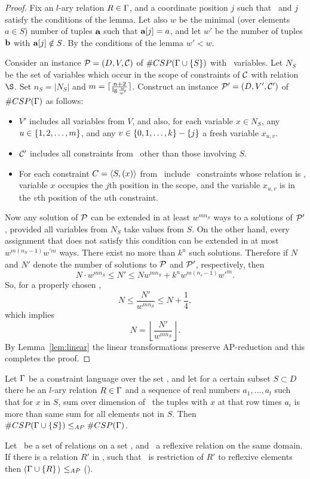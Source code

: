 \begin{proof} 
Fix an \(l\)-ary relation \(R \in \Gamma\)\@, and 
a coordinate position \(j\) such that \mR\ and \(j\) satisfy the conditions of the lemma.
Let also \(w\) be the minimal (over elements \(a\in S\)) number of tuples \(\textbf{a}\)
such that \(\textbf{a}[j]=a\), and let \(w'\) be the number of tuples \(\textbf{b}\) with
\(\textbf{a}[j] \notin S\). By the conditions of the lemma \(w'<w\)\@.

Consider an instance \(\mathcal{P}=(D,V,\mathcal{C})\) of \(\#CSP(\Gamma \cup \{{S}\})\)
with \mn\ variables. Let \(N_S\) be the set of
variables which occur in the scope of constraints of \(\mathcal{C}\) with relation \(\S\)\@. 
Set \(n_S = |N_S|\) and \(m = \lceil\frac{n+2}{\lg{\frac{w}{w'}}}\rceil\)\@.
Construct an instance \(\mathcal{P}'=(D,V',\mathcal{C}')\) of \(\#CSP(\Gamma)\) as follows:
\begin{itemize}
\item
\(V'\) includes all variables from \(V\),
and also, for each variable \(x \in N_S\), any \(u \in \{{{1,2,\dotsc,m}}\}\), and any
\(v\in\{{0,1,\dotsc,k}\}-\{j\}\) a fresh variable \(x_{u,v}\)\@. 
\item 
\(\mathcal{C}'\) includes all constraints from \mconset\ other than those involving \(S\)\@. 
\item
For each constraint \(C=\langle S, (x) \rangle\) from \mconset\ include \mm\ constraints whose
relation is \mR, variable \(x\) occupies the \(j\)th position in the scope,
and the variable \(x_{u,v}\) is in the \(v\)th position of the \(u\)th constraint.
\end{itemize}

Now any solution of \(\mathcal{P}\) can be extended in at least \(w^{mn_S}\) 
ways to a solutions of \(\mathcal{P}'\)\@, provided all variables from \(N_S\)
take values from \(S\)\@. On the other hand, every assignment that does not satisfy this
condition can be extended in at most \(w^{m(n_S-1)}w^{\prime m}\) ways.
There exist no more than \(k^n\) such solutions. Therefore if \(N\) and \(N'\)
denote the number of solutions to \(\mathcal{P}\) and \(\mathcal{P}'\), respectively, then
\[N\cdot w^{mn_S} \le N' \le Nw^{mn_S} + k^nw^{m(n_s-1)}w'^m.\]
So, for a properly chosen \mm, 
\[N \le \frac{N'}{w^{mn_S}} \le N + \frac{1}{4},\]
which implies
\[N = \left\lfloor \frac{N'}{w^{mn_S}} \right\rfloor.\]
By Lemma~\ref{lem:linear} the linear transformations preserve AP-reduction
and this completes the proof.
\end{proof}

\begin{cor}  \label{cor:degree}
Let \(\Gamma\) be a constraint language over the set \mD\@,
and let for a certain subset \(S \subset D\) 
there be an \(l\)-ary relation \(R \in \Gamma\) and a sequence of real numbers
\(a_1,\dotsc ,a_l\) such that for \(x\) in \(S\), sum over dimension of \mR\
the tuples with \(x\) at that row times \(a_i\) is more than same sum for
all elements not in \(S\).
Then \(\#CSP(\Gamma \cup \{{S}\}) \le_{AP} \#CSP(\Gamma)\)\@.
\end{cor}

\begin{cor}
Let \mrelset\ be a set of relations on a set \mD, and \mR\ a reflexive relation on the same domain. If there is a relation \(R'\) in \mrelset, such that \mR\ is restriction of
\(R'\) to reflexive elements then \ccsp(\(\Gamma \cup \{{R}\}\)) \(\le_{AP}\) \ccsp(\mrelset)\@.
\end{cor}
